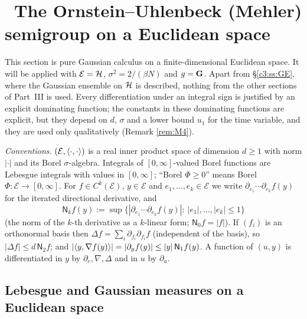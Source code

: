\section{\INFRA\ The Ornstein--Uhlenbeck (Mehler) semigroup on a Euclidean space}\label{sec:C3}

This section is pure Gaussian calculus on a finite-dimensional Euclidean space. It will be applied with $\mathcal E=\mathcal{H}$, $\sigma^2=2/(\beta N)$ and $g=\mathbf{G}$.
Apart from \S\ref{c3:ss:GE}, where the Gaussian ensemble on $\mathcal{H}$ is described, nothing from the other sections of Part~III is used.
Every differentiation under an integral sign is justified by an explicit dominating function; the constants in these dominating functions are explicit, but they depend on $d$, $\sigma$ and a lower bound $u_1$ for the time variable, and they are used only qualitatively (Remark \ref{rem:M4}).

\medskip\noindent\emph{Conventions.}
$(\mathcal E,\langle\cdot,\cdot\rangle)$ is a real inner product space of dimension $d\ge1$ with norm $|\cdot|$ and its Borel $\sigma$-algebra. Integrals of $[0,\infty]$-valued Borel functions are Lebesgue integrals with values in $[0,\infty]$; ``Borel $\Phi\ge0$'' means Borel $\Phi:\mathcal E\to[0,\infty]$.
For $f\in C^k(\mathcal E)$, $y\in\mathcal E$ and $e_1,\dots,e_k\in\mathcal E$ we write $\partial_{e_1}\cdots\partial_{e_k}f(y)$ for the iterated directional derivative, and
\[
\mathsf N_kf(y):=\sup\{|\partial_{e_1}\cdots\partial_{e_k}f(y)|:\ |e_1|,\dots,|e_k|\le1\}
\]
(the norm of the $k$-th derivative as a $k$-linear form; $\mathsf N_0f=|f|$). If $(f_i)$ is an orthonormal basis then $\Delta f=\sum_i\partial_{f_i}\partial_{f_i}f$ (independent of the basis), so $|\Delta f|\le d\,\mathsf N_2f$; and $|\langle y,\nabla f(y)\rangle|=|\partial_yf(y)|\le|y|\,\mathsf N_1f(y)$.
A function of $(u,y)$ is differentiated in $y$ by $\partial_e,\nabla,\Delta$ and in $u$ by $\partial_u$.

\subsection{Lebesgue and Gaussian measures on a Euclidean space}\label{c3:ss:gauss}

